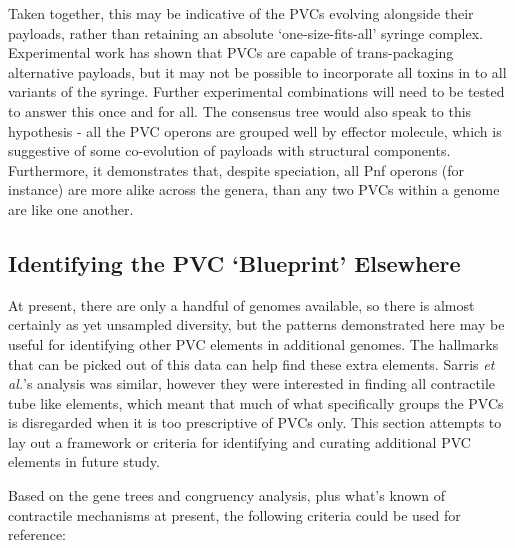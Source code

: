 Taken together, this may be indicative of the PVCs evolving alongside their payloads, rather than retaining an absolute `one-size-fits-all' syringe complex. Experimental work has shown that PVCs are capable of trans-packaging alternative payloads, but it may not be possible to incorporate all toxins in to all variants of the syringe. Further experimental combinations will need to be tested to answer this once and for all. The consensus tree would also speak to this hypothesis - all the PVC operons are grouped well by effector molecule, which is suggestive of some co-evolution of payloads with structural components. Furthermore, it demonstrates that, despite speciation, all Pnf operons (for instance) are more alike across the genera, than any two PVCs within a genome are like one another.

\subsection{Identifying the PVC `Blueprint' Elsewhere}
At present, there are only a handful of \Pa{} genomes available, so there is almost certainly as yet unsampled diversity, but the patterns demonstrated here may be useful for identifying other PVC elements in additional genomes. The hallmarks that can be picked out of this data can help find these extra elements. Sarris \emph{et al.}'s analysis was similar, however they were interested in finding all contractile tube like elements, which meant that much of what specifically groups the PVCs is disregarded when it is too prescriptive of PVCs only. This section attempts to lay out a framework or criteria for identifying and curating additional PVC elements in future study.

Based on the gene trees and congruency analysis, plus what's known of contractile mechanisms at present, the following criteria could be used for reference:

